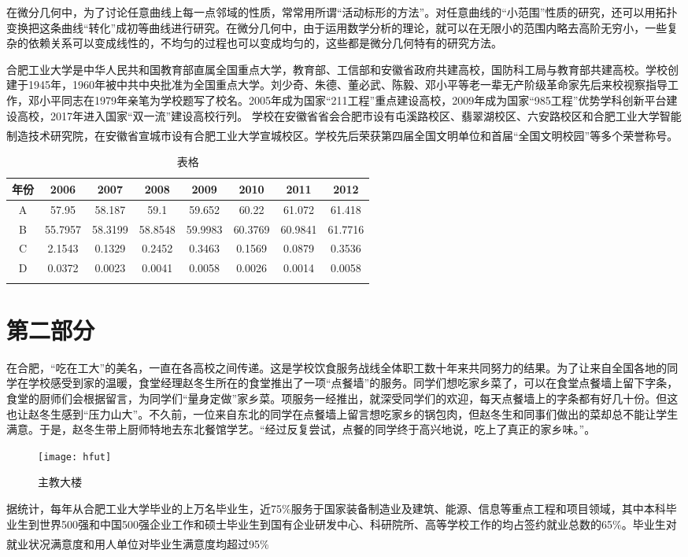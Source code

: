 \documentclass{hfutpaper}
\newcommand{\upcite}[1]{\textsuperscript{\textsuperscript{\cite{#1}}}}
\begin{document}
在微分几何中，为了讨论任意曲线上每一点邻域的性质，常常用所谓“活动标形的方法”。对任意曲线的“小范围”性质的研究，还可以用拓扑变换把这条曲线“转化”成初等曲线进行研究。在微分几何中，由于运用数学分析的理论，就可以在无限小的范围内略去高阶无穷小，一些复杂的依赖关系可以变成线性的，不均匀的过程也可以变成均匀的，这些都是微分几何特有的研究方法。


合肥工业大学是中华人民共和国教育部直属全国重点大学，教育部、工信部和安徽省政府共建高校，国防科工局与教育部共建高校。学校创建于1945年，1960年被中共中央批准为全国重点大学。刘少奇、朱德、董必武、陈毅、邓小平等老一辈无产阶级革命家先后来校视察指导工作，邓小平同志在1979年亲笔为学校题写了校名。2005年成为国家“211工程”重点建设高校，2009年成为国家“985工程”优势学科创新平台建设高校，2017年进入国家“双一流”建设高校行列。
学校在安徽省省会合肥市设有屯溪路校区、翡翠湖校区、六安路校区和合肥工业大学智能制造技术研究院，在安徽省宣城市设有合肥工业大学宣城校区。学校先后荣获第四届全国文明单位和首届“全国文明校园”等多个荣誉称号\upcite{bib:one}。
\begin{table}[H]
	\caption{表格}
	\centering
	\begin{tabular}{cccccccc}
		\toprule[1.5pt]
		年份  & 2006&2007&2008&2009&2010 & 2011 & 2012 \\
		\midrule
		A&57.95&58.187&59.1&59.652&60.22&61.072&61.418 \\
		B &55.7957 &58.3199&58.8548&59.9983&60.3769 &60.9841 &61.7716 \\		
		C&2.1543&0.1329&0.2452&0.3463&0.1569&0.0879&0.3536 \\		
		D&0.0372 &0.0023&0.0041&0.0058&0.0026&0.0014&0.0058 \\
		\bottomrule[1.5pt]
		\label{tab1}
	\end{tabular}
\end{table}
\section{第二部分}
在合肥，“吃在工大”的美名，一直在各高校之间传递。这是学校饮食服务战线全体职工数十年来共同努力的结果。为了让来自全国各地的同学在学校感受到家的温暖，食堂经理赵冬生所在的食堂推出了一项“点餐墙”的服务。同学们想吃家乡菜了，可以在食堂点餐墙上留下字条，食堂的厨师们会根据留言，为同学们“量身定做”家乡菜。项服务一经推出，就深受同学们的欢迎，每天点餐墙上的字条都有好几十份。但这也让赵冬生感到“压力山大”。不久前，一位来自东北的同学在点餐墙上留言想吃家乡的锅包肉，但赵冬生和同事们做出的菜却总不能让学生满意。于是，赵冬生带上厨师特地去东北餐馆学艺。“经过反复尝试，点餐的同学终于高兴地说，吃上了真正的家乡味。”。
\begin{figure}[H]%
	\centering  %
	\texttt{[image: hfut]}  %
	\caption{主教大楼}  %
	\label{fig1}
\end{figure}
据统计，每年从合肥工业大学毕业的上万名毕业生，近75\%服务于国家装备制造业及建筑、能源、信息等重点工程和项目领域，其中本科毕业生到世界500强和中国500强企业工作和硕士毕业生到国有企业研发中心、科研院所、高等学校工作的均占签约就业总数的65\%。毕业生对就业状况满意度和用人单位对毕业生满意度均超过95\%\upcite{bib:two}
\cite{Cui2019}





\end{document}

